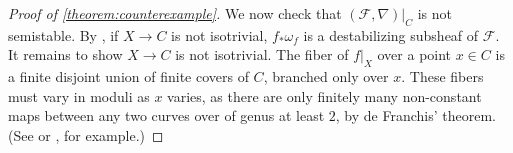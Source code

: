 \documentclass[12 pt]{amsart}
\theoremstyle{plain}
\newtheorem{lemma}[subsubsection]{Lemma}
\theoremstyle{definition}
\theoremstyle{remark}
\numberwithin{equation}{section}
\begin{document}
\begin{proof}[Proof of \autoref{theorem:counterexample}]
We now check that $(\mathscr{F}, \nabla)|_C$ is not semistable.  
By \cite[Theorem
4]{cataneseD:answer-to-a-question-by-fujita},
if $X \to C$ is not isotrivial,
$f_* \omega_f$ is a destabilizing subsheaf of $\mathscr F$.
It remains to show $X \to C$ is not isotrivial.
The fiber of $f|_X$ over a point $x\in C$ is a finite disjoint union of
finite covers of $C$, branched only over $x$. These fibers must vary in moduli as $x$ varies,
as there are only finitely many non-constant maps between any
two curves over of genus at least $2$, 
by de Franchis' theorem. 
(See \cite{de1913teorema} or \cite[Corollary 3, p.~75]{samuel1966lectures}, for
example.)
\end{proof}
\end{document}
